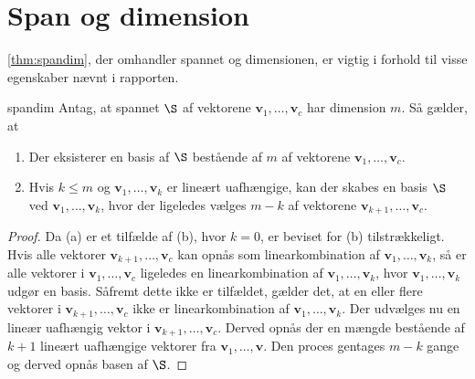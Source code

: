\chapter{Span og dimension}
%
\ref{thm:spandim}, der omhandler spannet og dimensionen, er vigtig i forhold til visse egenskaber nævnt i rapporten.
%
\begin{thm}{}{spandim}
Antag, at spannet $\S$ af vektorene $\textbf{v}_1,\ldots,\textbf{v}_c$ har dimension $m$.
Så gælder, at
\begin{enumerate}[label=(\alph*)]
\item Der eksisterer en basis af $\S$ bestående af $m$ af vektorene $\mathbf{v}_1,\ldots,\mathbf{v}_c$.
\item Hvis $k\leq m$ og $\mathbf{v}_1,\ldots,\mathbf{v}_k$ er lineært uafhængige, kan der skabes en basis $\S$ ved $\mathbf{v}_1,\ldots,\mathbf{v}_k$, hvor der ligeledes vælges $m-k$ af vektorene $\mathbf{v}_{k+1},\ldots,\textbf{v}_c$.
\end{enumerate}
\end{thm}

\begin{proof}
Da (a) er et tilfælde af (b), hvor $k=0$, er beviset for (b) tilstrækkeligt.
Hvis alle vektorer $\mathbf{v}_{k+1},\ldots,\textbf{v}_c$ kan opnås som linearkombination af $\mathbf{v}_1,\ldots,\mathbf{v}_k$, så er alle vektorer i $\mathbf{v}_{1},\ldots,\textbf{v}_c$ ligeledes en linearkombination af $\mathbf{v}_1,\ldots,\mathbf{v}_k$, hvor $\mathbf{v}_1,\ldots,\mathbf{v}_k$ udgør en basis.
Såfremt dette ikke er tilfældet, gælder det, at en eller flere vektorer i $\mathbf{v}_{k+1},\ldots,\textbf{v}_c$ ikke er linearkombination af $\mathbf{v}_1,\ldots,\mathbf{v}_k$. 
Der udvælges nu en lineær uafhængig vektor i $\mathbf{v}_{k+1},\ldots,\textbf{v}_c$.
Derved opnås der en mængde bestående af $k+1$ lineært uafhængige vektorer fra $\mathbf{v}_{1},\ldots,\mathbf{v}$.
Den proces gentages $m-k$ gange og derved opnås basen af $\S$.
\end{proof}
%